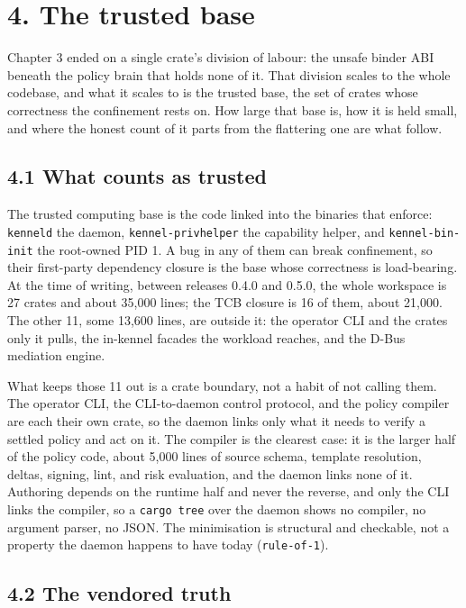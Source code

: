 \hypertarget{the-trusted-base}{%
\chapter{4. The trusted base}\label{the-trusted-base}}

Chapter 3 ended on a single crate's division of labour: the unsafe
binder ABI beneath the policy brain that holds none of it. That division
scales to the whole codebase, and what it scales to is the trusted base,
the set of crates whose correctness the confinement rests on. How large
that base is, how it is held small, and where the honest count of it
parts from the flattering one are what follow.

\hypertarget{what-counts-as-trusted}{%
\section{4.1 What counts as trusted}\label{what-counts-as-trusted}}

The trusted computing base is the code linked into the binaries that
enforce: \texttt{kenneld} the daemon, \texttt{kennel-privhelper} the
capability helper, and \texttt{kennel-bin-init} the root-owned PID 1. A
bug in any of them can break confinement, so their first-party
dependency closure is the base whose correctness is load-bearing. At the
time of writing, between releases 0.4.0 and 0.5.0, the whole workspace
is 27 crates and about 35,000 lines; the TCB closure is 16 of them,
about 21,000. The other 11, some 13,600 lines, are outside it: the
operator CLI and the crates only it pulls, the in-kennel facades the
workload reaches, and the D-Bus mediation engine.

What keeps those 11 out is a crate boundary, not a habit of not calling
them. The operator CLI, the CLI-to-daemon control protocol, and the
policy compiler are each their own crate, so the daemon links only what
it needs to verify a settled policy and act on it. The compiler is the
clearest case: it is the larger half of the policy code, about 5,000
lines of source schema, template resolution, deltas, signing, lint, and
risk evaluation, and the daemon links none of it. Authoring depends on
the runtime half and never the reverse, and only the CLI links the
compiler, so a \texttt{cargo\ tree} over the daemon shows no compiler,
no argument parser, no JSON. The minimisation is structural and
checkable, not a property the daemon happens to have today
(\texttt{rule-of-1}).

\hypertarget{the-vendored-truth}{%
\section{4.2 The vendored truth}\label{the-vendored-truth}}

